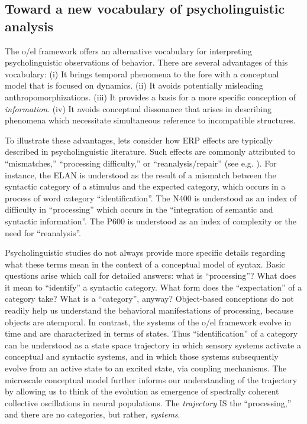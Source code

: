\subsection{Toward a new vocabulary of psycholinguistic analysis}

The o/el framework offers an alternative vocabulary for interpreting psycholinguistic observations of behavior. There are several advantages of this vocabulary: (i) It brings temporal phenomena to the fore with a conceptual model that is focused on dynamics. (ii) It avoids potentially misleading anthropomorphizations. (iii) It provides a basis for a more specific conception of \textit{information}. (iv) It avoids conceptual dissonance that arises in describing phenomena which necessitate simultaneous reference to incompatible structures.

To illustrate these advantages, lets consider how ERP effects are typically described in psycholinguistic literature. Such effects are commonly attributed to “mismatches,” “processing difficulty,” or “reanalysis/repair” (see e.g. \citealt{Friederici2002,KutasFedermeier2011}). For instance, the ELAN is understood as the result of a mismatch between the syntactic category of a stimulus and the expected category, which occurs in a process of word category “identification”. The N400 is understood as an index of difficulty in “processing” which occurs in the “integration of semantic and syntactic information”. The P600 is understood as an index of complexity or the need for “reanalysis”.

Psycholinguistic studies do not always provide more specific details regarding what these terms mean in the context of a conceptual model of syntax. Basic questions arise which call for detailed answers: what is “processing”? What does it mean to “identify” a syntactic category. What form does the “expectation” of a category take? What is a “category”, anyway? Object-based conceptions do not readily help us understand the behavioral manifestations of processing, because objects are atemporal. In contrast, the systems of the o/el framework evolve in time and are characterized in terms of states. Thus “identification” of a category can be understood as a state space trajectory in which sensory systems activate a conceptual and syntactic systems, and in which those systems subsequently evolve from an active state to an excited state, via coupling mechanisms. The microscale conceptual model further informs our understanding of the trajectory by allowing us to think of the evolution as emergence of spectrally coherent collective oscillations in neural populations. The \textit{trajectory} IS the “processing,” and there are no categories, but rather, \textit{systems}.


